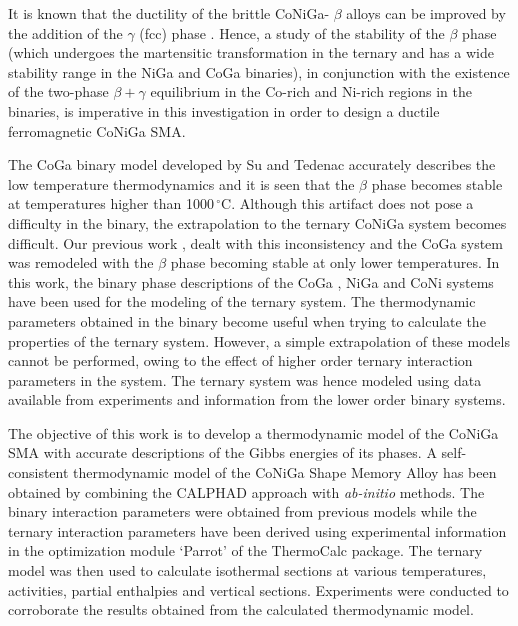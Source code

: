 \documentclass[article]{elsarticle}
\begin{document}
It is known that the ductility of the brittle CoNiGa- $\beta$ alloys
can be improved by the addition of the $\gamma$ (fcc) phase \cite{Oik01}.
Hence, a study of the stability of the $\beta$ phase (which undergoes the martensitic transformation
in the ternary and has a wide stability range in the NiGa and CoGa binaries), in conjunction with the
existence of the two-phase $\beta+\gamma$ equilibrium in the Co-rich and Ni-rich regions in the binaries,
is imperative in this investigation in order to design a ductile ferromagnetic CoNiGa SMA.

The CoGa binary model developed by Su and Tedenac \cite{05Su} accurately describes the low temperature thermodynamics and it is seen that the $\beta$ phase becomes stable at temperatures higher than 1000$\,^{\circ}\mathrm{C}$.
Although this artifact does not pose a difficulty in the binary, the extrapolation to the ternary CoNiGa
system becomes difficult. Our previous work \cite{Cha10}, dealt with this inconsistency and
the CoGa system was remodeled with the $\beta$ phase becoming stable at only lower temperatures.
In this work, the binary phase descriptions of the CoGa \cite{Cha10}, NiGa \cite{Ipser04}
and CoNi \cite{Nish90} systems have been used for the modeling of the ternary system.
The thermodynamic parameters obtained in the binary become useful when trying to calculate the
properties of the ternary system. However, a simple extrapolation of these models cannot be performed, owing to the effect of higher order ternary interaction parameters in the system. The ternary system was hence modeled using data available from experiments and information from the lower order binary systems.

The objective of this work is to develop a thermodynamic model of the CoNiGa SMA with accurate descriptions of the Gibbs energies of its phases. A self-consistent thermodynamic model of the CoNiGa Shape Memory Alloy has been obtained by combining the CALPHAD approach with \textit{ab-initio} methods. The binary interaction parameters were obtained from previous models \cite{Ipser04,Cha10,Nish90} while the ternary interaction parameters have been derived using experimental information in the optimization module `Parrot' of the ThermoCalc package. The ternary model was then used to calculate isothermal sections at various temperatures, activities, partial enthalpies and vertical sections. Experiments were conducted to corroborate the results obtained from the calculated thermodynamic model.
\end{document}
